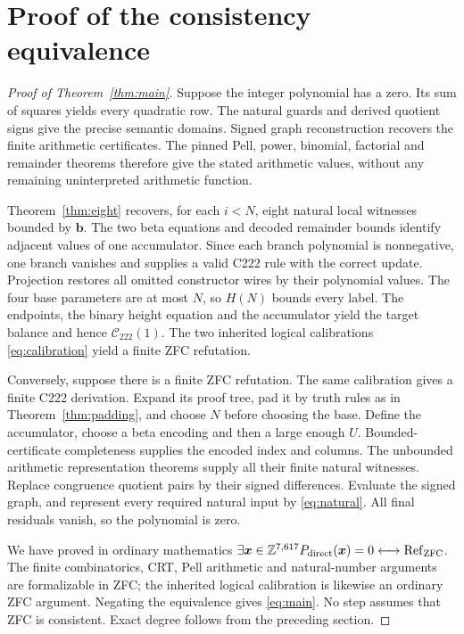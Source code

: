 \documentclass[11pt,a4paper]{article}
\theoremstyle{definition}\newtheorem{definition}[theorem]{Definition}
\theoremstyle{remark}\newtheorem{remark}[theorem]{Remark}
\newcommand{\Ccal}{\mathcal C_{222}}\newcommand{\SOS}{\operatorname{SOS}}
\numberwithin{equation}{section}
\begin{document}
\section{Proof of the consistency equivalence}
\label{sec:composition}

\begin{proof}[Proof of Theorem~\ref{thm:main}]
Suppose the integer polynomial has a zero. Its sum of squares yields
every quadratic row. The natural guards and derived quotient signs give
the precise semantic domains. Signed graph reconstruction recovers the
finite arithmetic certificates. The pinned Pell, power, binomial,
factorial and remainder theorems therefore give the stated arithmetic
values, without any remaining uninterpreted arithmetic function.

Theorem~\ref{thm:eight} recovers, for each \(i<N\), eight
natural local witnesses bounded by \(\boldsymbol b\). The two beta
equations and decoded remainder bounds identify adjacent values of one
accumulator. Since each
branch polynomial is nonnegative, one branch vanishes and supplies a
valid C222 rule with the correct update. Projection restores all omitted
constructor wires by their polynomial values. The four base parameters
are at most \(N\), so \(H(N)\) bounds every label.
The endpoints, the binary height equation and the accumulator yield
the target balance and hence \(\Ccal(1)\). The two inherited logical
calibrations \eqref{eq:calibration} yield a finite ZFC refutation.

Conversely, suppose there is a finite ZFC refutation. The same
calibration gives a finite C222 derivation. Expand its proof tree, pad it
by truth rules as in Theorem~\ref{thm:padding}, and choose \(N\) before
choosing the base. Define the accumulator, choose a beta encoding and
then a large enough \(U\). Bounded-certificate completeness supplies
the encoded index and columns. The unbounded arithmetic representation
theorems supply all their finite natural witnesses. Replace congruence
quotient pairs by their signed differences. Evaluate the signed graph,
and represent every required natural input by \eqref{eq:natural}.
All final residuals vanish, so the polynomial is zero.

We have proved in ordinary mathematics
\(\exists\boldsymbol x\in\mathbb Z^{7{,}617}P_{\rm direct}(\boldsymbol x)=0
\longleftrightarrow\operatorname{Ref}_{\rm ZFC}\). The finite combinatorics, CRT,
Pell arithmetic and natural-number arguments are formalizable in ZFC;
the inherited logical calibration is likewise an ordinary ZFC
argument. Negating the equivalence gives \eqref{eq:main}. No step assumes
that ZFC is consistent. Exact degree follows from the preceding section.
\end{proof}
\end{document}
